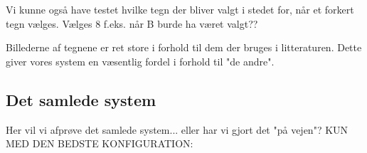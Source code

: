 \begin{comment}
Syntaks analyse: Hvilke hits bliver valgt på hitlisterne af syntaksanalysen (sæt maxhitno højt):

\begin{tabular}{|l|c|}\hline
\multicolumn{2}{|l|}{Træningssæt} \\\hline
Hitnr. & Valgt \\\hline
1 & 95,4\% \\\hline
2 & 3\% \\\hline
3 & 0\% \\\hline
4 & 0\% \\\hline
5 & 0\% \\\hline
6 & 0\% \\\hline \end{tabular}

\begin{tabular}{|l|c|}\hline
\multicolumn{2}{|l|}{Kontrolsæt} \\\hline
Hitnr. & Valgt \\\hline
1 & 92,9\% \\\hline
2 & 0\% \\\hline
3 & 0\% \\\hline
4 & 0\% \\\hline
5 & 0\% \\\hline
6 & 0\% \\\hline \end{tabular}

\end{comment} %





Vi kunne også have testet hvilke tegn der bliver valgt i stedet for, når et forkert tegn vælges. Vælges 8 f.eks. når B burde ha været valgt??

Billederne af tegnene er ret store i forhold til dem der bruges i litteraturen. Dette giver vores system en væsentlig fordel i forhold til "de andre".

\subsection{Det samlede system}

Her vil vi afprøve det samlede system... eller har vi gjort det "på vejen"?
KUN MED DEN BEDSTE KONFIGURATION:

